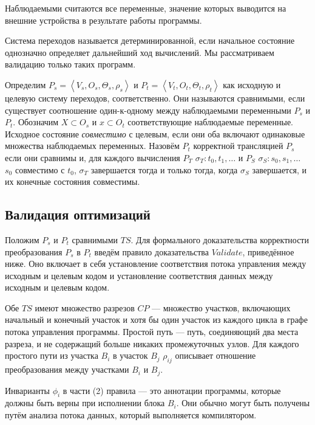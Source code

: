 Наблюдаемыми считаются все переменные, значение которых выводится на внешние устройства в результате работы программы.

Система переходов называется детерминированной, если начальное состояние однозначно определяет дальнейший ход вычислений. Мы рассматриваем валидацию только таких программ.

Определим $P_{s} = \left\langle  V_{s}, O_{s}, \Theta_{s}, \rho_{s} \right\rangle $ и $P_{t} = \left\langle  V_{t}, O_{t}, \Theta_{t}, \rho_{t} \right\rangle $ как исходную и целевую систему переходов, соответственно. Они называются сравнимыми, если существует соотношение один-к-одному между наблюдаемыми переменными $P_{s}$ и $P_{t}$. Обозначим $ X \subset O_{s} $ и $ x \subset O_{t} $ соответствующие наблюдаемые переменные. Исходное состояние \emph{совместимо} с целевым, если они оба включают одинаковые множества наблюдаемых переменных. Назовём $P_{t}$ корректной трансляцией $P_{s}$ если они сравнимы и, для каждого вычисления $P_{T}$ $\sigma_{T}: t_{0}, t_{1}, \ldots$ и $P_{S}$ $\sigma_{S}: s_{0}, s_{1}, \ldots $ $s_{0}$ совместимо с $t_{0}$, $\sigma_{T}$ завершается тогда и только тогда, когда $\sigma_{S}$ завершается, и их конечные состояния совместимы.

\subsection{Валидация оптимизаций}

Положим $P_{s}$ и $P_{t}$ сравнимыми $TS$. Для формального доказательства корректности преобразования $P_{s}$ в $P_{t}$ введём правило доказательства $Validate$, приведённое ниже. Оно включает в себя установление соответствия потока управления между исходным и целевым кодом и установление соответствия данных между исходным и целевым кодом.

Обе $TS$ имеют множество разрезов $CP$ --- множество участков, включающих начальный и конечный участок и хотя бы один участок из каждого цикла в графе потока управления программы. Простой путь --- путь, соединяющий два места разреза, и не содержащий больше никаких промежуточных узлов. Для каждого простого пути из участка $B_{i}$ в участок $B_{j}$ $\rho_{ij}$ описывает отношение преобразования между участками $B_{i}$ и $B_{j}$.

Инварианты $\phi_{i}$ в части (2) правила --- это аннотации программы, которые должны быть верны при исполнении блока $B_{i}$. Они обычно могут быть получены путём анализа потока данных, который выполняется компилятором.

